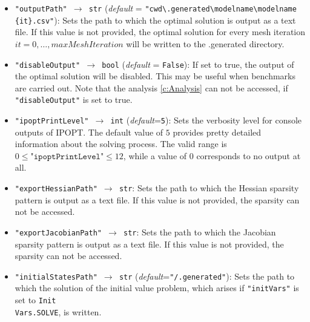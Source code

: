 \documentclass[12pt]{article}
\begin{document}
\begin{mdframed}[backgroundcolor=gray!10, roundcorner=10pt,
		linewidth=1pt]
\begin{itemize}
		      \label{flag:outputPath}
		\item \texttt{"outputPath" $\rightarrow$ str} (\emph{default} = \texttt{"cwd\textbackslash .generated\textbackslash modelname\textbackslash modelname\\\{it\}.csv"}): Sets the path to
		      which the optimal solution is output as a text file. If this
		      value is not provided,
		      the optimal solution for every mesh iteration $it=0, \ldots,
			      maxMeshIteration$ will be written to the .generated directory.

		      \label{flag:disableOutput}
		\item \texttt{"disableOutput" $\rightarrow$ bool} (\emph{default} = \texttt{False}): If set to true, the output of the optimal solution will be disabled. This may be useful when benchmarks are carried out.
		      Note that the analysis \eqref{c:Analysis} can not be accessed, if \texttt{"disableOutput"} is set to true.

		      \label{flag:ipoptPrintLevel}
		\item \texttt{"ipoptPrintLevel" $\rightarrow$ int}
		      (\emph{default}=\texttt{5}): Sets the verbosity level for
		      console outputs of IPOPT. The default value of $5$ provides pretty detailed
		      information about the solving process. The valid range is $0 \leq
			      \texttt{"ipoptPrintLevel"} \leq 12$, while a value of $0$ corresponds to no
		      output at all.

		      \label{flag:exportHessianPath}
		\item \texttt{"exportHessianPath" $\rightarrow$ str}: Sets the
		      path to
		      which the Hessian sparsity pattern is output as a text
		      file. If this value is
		      not provided, the sparsity can not be accessed.

		      \label{flag:exportJacobianPath}
		\item \texttt{"exportJacobianPath" $\rightarrow$ str}: Sets the
		      path to
		      which the Jacobian sparsity pattern is output as a text
		      file. If this value is
		      not provided, the sparsity can not be accessed.

		      \label{flag:initialStatesPath}
		\item \texttt{"initialStatesPath" $\rightarrow$ str}
		      (\emph{default}=\texttt{"/.generated"}): Sets the path to
		      which the solution of
		      the initial value problem, which arises if
		      \texttt{"initVars"} is set to
		      \texttt{Init\\Vars.SOLVE}, is written.


\end{itemize}
\end{mdframed}
\end{document}
